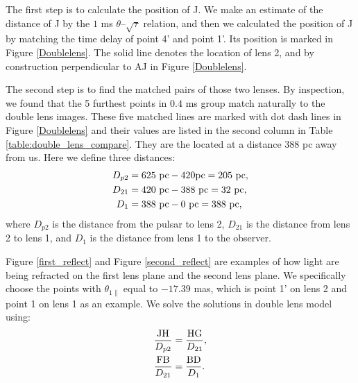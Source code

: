 \documentclass[useAMS,usenatbib]{mn2e}
\begin{document}

The first step is to calculate the position of J. We make an estimate
of the distance of J by the $1$ ms $\theta$--$\sqrt{\tau}$ relation,
and then we calculated the position of J by matching the time delay of
point 4' and point 1'. Its position is marked  in 
Figure \ref{Doublelens}.  The solid line denotes the location of lens 2,
and by construction perpendicular to AJ in Figure 
\ref{Doublelens}.

The second step is to find the matched pairs of those two lenses. By
inspection, we found that the 5 furthest points in $0.4$ ms group match
naturally to the double lens images.  These five matched lines are marked with dot dash lines in Figure \ref{Doublelens} and their values are listed in the second column in Table \ref{table:double_lens_compare}. 
They are the located at a distance $388$ pc away from us. Here we define three distances:
\begin{equation}
\begin{aligned}
D_{p2}&=625~{\rm pc}-420{\rm pc} =205~{\rm pc},\\
D_{21}&=420~{\rm pc}-388~{\rm pc} =32~{\rm pc},\\
D_{1}&=388~{\rm pc}- 0~{\rm pc} = 388~{\rm pc}, 
\end{aligned} 
\end{equation}
where $D_{p2}$ is the distance from the pulsar to lens 2, $D_{21}$ is the distance from lens 2 to lens 1, and $D_{1}$ is the distance from lens 1 to the observer.

Figure \ref{first_reflect} and Figure \ref{second_reflect} are examples of how light are being refracted on the first lens plane and the second lens plane. We specifically choose the points with $\theta_{1\parallel}$ equal to $-17.39$ mas, which is point 1' on lens 2 and point 1 on lens 1 as an example. We solve the solutions in double lens model using:
\begin{equation}
\begin{aligned}
\frac{\rm JH}{D_{p2}}&=\frac{\rm HG}{D_{21}},\\
\frac{\rm FB}{D_{21}}&=\frac{\rm BD}{D_{1}}.
\end{aligned}
\end{equation}
\end{document}
